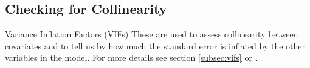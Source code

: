 \subsection{Checking for Collinearity}

\begin{frame}[fragile]
\begin{block}{Variance Inflation Factors (VIFs)}
These are used to assess collinearity between covariates and to tell us by how much the standard error is inflated by the other variables in the model.  For more details see section \ref{subsec:vifs} or  \citet{Fox2011}.
\end{block}

 \end{frame}

